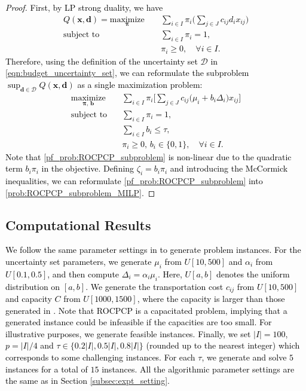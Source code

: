 \documentclass[preprint,review,11pt]{elsarticle}
\theoremstyle{definition}
\theoremstyle{remark}
\newcommand{\calD}{\mathcal{D}}
\newcommand{\xb}{\pmb{x}}
\newcommand{\db}{\pmb{d}}
\newcommand{\bb}{\pmb{b}}
\newcommand{\pib}{\pmb{\pi}}
\newcommand{\blue}{\textcolor{black}}
\begin{document}
\blue{
\begin{proof}
First, by LP strong duality, we have
%
\begin{subequations}
\begin{align}
Q(\xb,\db)=\underset{\pib}{\text{maximize}}\, \quad
&  \sum_{i\in I} \pi_i \Bigg( \sum_{j\in J} c_{ij}d_ix_{ij} \Bigg)\\
\text{subject to} \quad
& \sum_{i\in I}\pi_i=1, \\
& \pi_i \geq 0,\quad\forall i\in I.
\end{align} \label{pf_prob:ROCPCP_SS_dual}%
\end{subequations}
%
Therefore, using the definition of the uncertainty set $\calD$ in \eqref{eqn:budget_uncertainty_set}, we can reformulate the subproblem $\sup_{\db\in\calD} Q(\xb,\db)$ as a single maximization problem:
%
\begin{subequations}
\begin{align}
\underset{\pib,\,\bb}{\text{maximize}}\, \quad
& \sum_{i\in I} \pi_i \Bigg[ \sum_{j\in J} c_{ij}\big(\mu_i + b_i\Delta_i\big)x_{ij} \Bigg]\\
\text{subject to} \quad
& \sum_{i\in I}\pi_i=1,\\
& \sum_{i\in I} b_i \leq \tau, \\
& \pi_i \geq 0,\, b_i\in\{0,1\},\quad\forall i\in I.
\end{align} \label{pf_prob:ROCPCP_subproblem}%
\end{subequations}
%
Note that \eqref{pf_prob:ROCPCP_subproblem} is non-linear due to the quadratic term $b_i\pi_i$ in the objective. Defining $\zeta_{i}=b_i\pi_i$ and introducing the McCormick inequalities, we can reformulate \eqref{pf_prob:ROCPCP_subproblem} into \eqref{prob:ROCPCP_subproblem_MILP}.
\end{proof}
}

\subsection{Computational Results}  \label{appdx:ROCPC_comp_results}

\blue{
We follow the same parameter settings in  to generate problem instances. For the uncertainty set parameters, we generate $\mu_i$ from $U[10,500]$ and $\alpha_i$ from $U[0.1,0.5]$, and then compute $\Delta_i=\alpha_i\mu_i$. Here, $U[a,b]$ denotes the uniform distribution on $[a,b]$. We generate the transportation cost $c_{ij}$ from $U[10,500]$ and capacity $C$ from $U[1000,1500]$, where the capacity is larger than those generated in .  Note that ROCPCP is a capacitated problem, implying that a generated instance could be infeasible if the capacities are too small. For illustrative purposes, we generate feasible instances. Finally, we set $|I|=100$, $p=|I|/4$ and $\tau\in\{0.2|I|, 0.5|I|, 0.8|I|\}$ (rounded up to the nearest integer) which corresponds to some challenging instances. For each $\tau$, we generate and solve $5$ instances for a total of $15$ instances. All the algorithmic parameter settings are the same as in Section \ref{subsec:expt_setting}.
}
\end{document}
